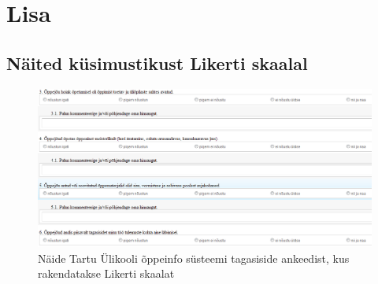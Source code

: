 \documentclass[a4paper,12pt,oneside]{article}
\numberwithin{equation}{section}
\theoremstyle{definition}
\begin{document}
\pagebreak
{}


\pagebreak

\section*{Lisa}

\begin{subappendices}
\subsection{Näited küsimustikust Likerti skaalal}


\begin{figure}[H]
\centering
\includegraphics[width=1\textwidth]{ois_tagasiside_toodeldud.png}
\caption{Näide Tartu \"Ulikooli õppeinfo s\"usteemi tagasiside ankeedist, kus rakendatakse Likerti skaalat \cite{UT}}
\label{likert1}
\end{figure}


\end{subappendices}
\end{document}
